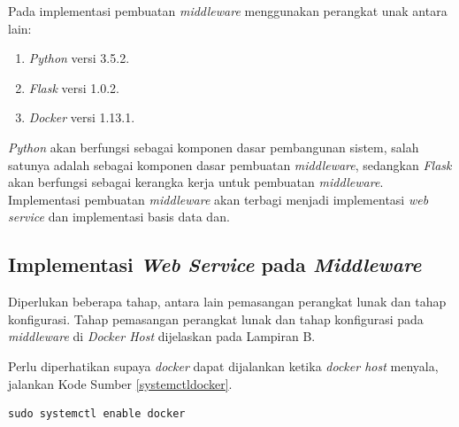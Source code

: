   Pada implementasi pembuatan \textit{middleware} menggunakan perangkat unak antara lain:
  \begin{enumerate}
	\item \textit{Python} versi 3.5.2.
	\item \textit{Flask} versi 1.0.2.
	\item \textit{Docker} versi 1.13.1.
  \end{enumerate}
  
  \textit{Python} akan berfungsi sebagai komponen dasar pembangunan sistem, salah satunya adalah sebagai komponen dasar pembuatan \textit{middleware}, sedangkan \textit{Flask} akan berfungsi sebagai kerangka kerja untuk pembuatan \textit{middleware}. Implementasi pembuatan \textit{middleware} akan terbagi menjadi implementasi \textit{web service} dan implementasi basis data dan.
  
  \subsection{Implementasi \textit{Web Service} pada \textit{Middleware}}
  Diperlukan beberapa tahap, antara lain pemasangan perangkat lunak dan tahap konfigurasi. Tahap pemasangan perangkat lunak dan tahap konfigurasi pada \textit{middleware} di \textit{Docker Host} dijelaskan pada Lampiran B.
   
  Perlu diperhatikan supaya \textit{docker} dapat dijalankan ketika \textit{docker host} menyala, jalankan Kode Sumber \ref{systemctldocker}.\\
  \begin{minipage}{\linewidth}
  \begin{lstlisting}[caption=Command untuk installasi Flask,language=Python,label=systemctldocker]
  sudo systemctl enable docker
  \end{lstlisting}
  \end{minipage} 

